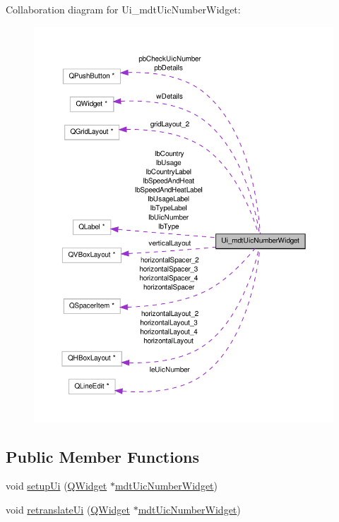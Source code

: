 Collaboration diagram for Ui\-\_\-mdt\-Uic\-Number\-Widget\-:
\nopagebreak
\begin{figure}[H]
\begin{center}
\leavevmode
\includegraphics[width=350pt]{class_ui__mdt_uic_number_widget__coll__graph}
\end{center}
\end{figure}
\subsection*{Public Member Functions}
\begin{DoxyCompactItemize}
\item 
void \hyperlink{class_ui__mdt_uic_number_widget_a5bcf4bc93d6fb43df9c27415267b9861}{setup\-Ui} (\hyperlink{class_q_widget}{Q\-Widget} $\ast$\hyperlink{classmdt_uic_number_widget}{mdt\-Uic\-Number\-Widget})
\item 
void \hyperlink{class_ui__mdt_uic_number_widget_a6b54290c2309a71e43004ccf22a7796a}{retranslate\-Ui} (\hyperlink{class_q_widget}{Q\-Widget} $\ast$\hyperlink{classmdt_uic_number_widget}{mdt\-Uic\-Number\-Widget})
\end{DoxyCompactItemize}
